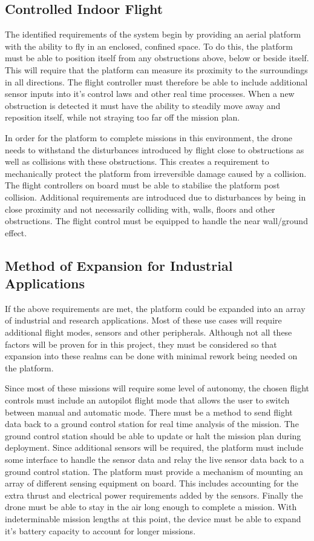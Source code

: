 		\subsection{Controlled Indoor Flight}
		The identified requirements of the system begin by providing an aerial platform with the ability to fly in an enclosed, confined space. To do this, the platform must be able to position itself from any obstructions above, below or beside itself. This will require that the platform can measure its proximity to the surroundings in all directions. The flight controller must therefore be able to include additional sensor inputs into it's control laws and other real time processes. When a new obstruction is detected it must have the ability to steadily move away and reposition itself, while not straying too far off the mission plan.
		
		In order for the platform to complete missions in this environment, the drone needs to withstand the disturbances introduced by flight close to obstructions as well as collisions with these obstructions. This creates a requirement to mechanically protect the platform from irreversible damage caused by a collision. The flight controllers on board must be able to stabilise the platform post collision. Additional requirements are introduced due to disturbances by being in close proximity and not necessarily colliding with, walls, floors and other obstructions. The flight control must be equipped to handle the near wall/ground effect.
		
		\subsection{Method of Expansion for Industrial Applications}
		If the above requirements are met, the platform could be expanded into an array of industrial and research applications. Most of these use cases will require additional flight modes, sensors and other peripherals. Although not all these factors will be proven for in this project, they must be considered so that expansion into these realms can be done with minimal rework being needed on the platform.
		
		Since most of these missions will require some level of autonomy, the chosen flight controls must include an autopilot flight mode that allows the user to switch between manual and automatic mode. There must be a method to send flight data back to a ground control station for real time analysis of the mission. The ground control station should be able to update or halt the mission plan during deployment. Since additional sensors will be required, the platform must include some interface to handle the sensor data and relay the live sensor data back to a ground control station. The platform must provide a mechanism of mounting an array of different sensing equipment on board. This includes accounting for the extra thrust and electrical power requirements added by the sensors. Finally the drone must be able to stay in the air long enough to complete a mission. With indeterminable mission lengths at this point, the device must be able to expand it's battery capacity to account for longer missions.
